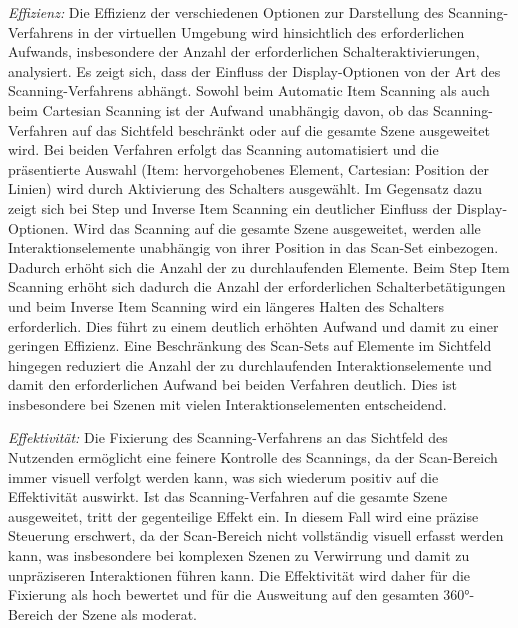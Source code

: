 \textit{Effizienz:}
Die Effizienz der verschiedenen Optionen zur Darstellung des Scanning-Verfahrens in der virtuellen Umgebung wird hinsichtlich des erforderlichen Aufwands, insbesondere der Anzahl der erforderlichen Schalteraktivierungen, analysiert. Es zeigt sich, dass der Einfluss der Display-Optionen von der Art des Scanning-Verfahrens abhängt.
Sowohl beim Automatic Item Scanning als auch beim Cartesian Scanning ist der Aufwand unabhängig davon, ob das Scanning-Verfahren auf das Sichtfeld beschränkt oder auf die gesamte Szene ausgeweitet wird. Bei beiden Verfahren erfolgt das Scanning automatisiert und die präsentierte Auswahl (Item: hervorgehobenes Element, Cartesian: Position der Linien) wird durch Aktivierung des Schalters ausgewählt. Im Gegensatz dazu zeigt sich bei Step und Inverse Item Scanning ein deutlicher Einfluss der Display-Optionen. Wird das Scanning auf die gesamte Szene ausgeweitet, werden alle Interaktionselemente unabhängig von ihrer Position in das Scan-Set einbezogen. Dadurch erhöht sich die Anzahl der zu durchlaufenden Elemente. Beim Step Item Scanning erhöht sich dadurch die Anzahl der erforderlichen Schalterbetätigungen und beim Inverse Item Scanning wird ein längeres Halten des Schalters erforderlich. Dies führt zu einem deutlich erhöhten Aufwand und damit zu einer geringen Effizienz. Eine Beschränkung des Scan-Sets auf Elemente im Sichtfeld hingegen reduziert die Anzahl der zu durchlaufenden Interaktionselemente und damit den erforderlichen Aufwand bei beiden Verfahren deutlich. Dies ist insbesondere bei Szenen mit vielen Interaktionselementen entscheidend. 

\textit{Effektivität:}
Die Fixierung des Scanning-Verfahrens an das Sichtfeld des Nutzenden ermöglicht eine feinere Kontrolle des Scannings, da der Scan-Bereich immer visuell verfolgt werden kann, was sich wiederum positiv auf die Effektivität auswirkt. Ist das Scanning-Verfahren auf die gesamte Szene ausgeweitet, tritt der gegenteilige Effekt ein. In diesem Fall wird eine präzise Steuerung erschwert, da der Scan-Bereich nicht vollständig visuell erfasst werden kann, was insbesondere bei komplexen Szenen zu Verwirrung und damit zu unpräziseren Interaktionen führen kann. Die Effektivität wird daher für die Fixierung als hoch bewertet und für die Ausweitung auf den gesamten 360°-Bereich der Szene als moderat. 

